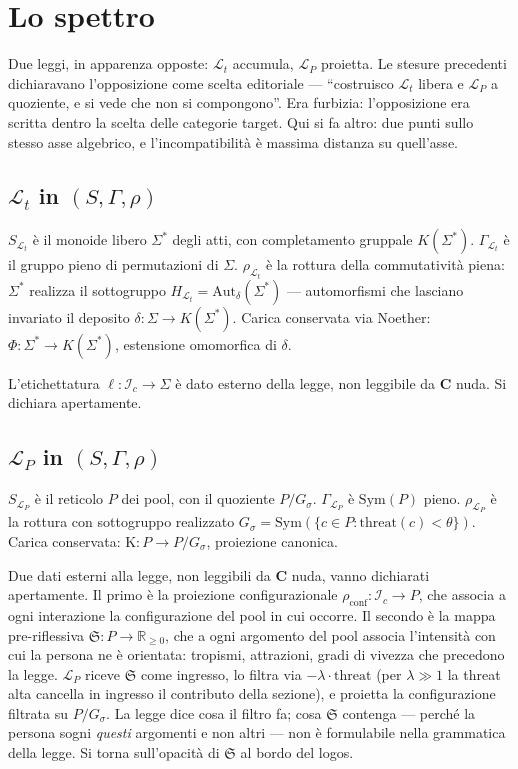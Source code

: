 \documentclass[
    oneside,                 %
    openany,                 %
    titlepage,
    11pt,
    a4paper,
    italian,
    DIV=14,                  %
    headinclude,
    footinclude=true,
    cleardoublepage=empty
]{scrbook}
\theoremstyle{ctplain}
\theoremstyle{ctdef}
\theoremstyle{ctrem}
\newcommand{\Lt}{\mathcal{L}_t}
\newcommand{\LP}{\mathcal{L}_P}
\newcommand{\Sogno}{\mathfrak{S}}
\newcommand{\Phii}{\Phi}
\newcommand{\Kappaa}{\mathrm{K}}
\newcommand{\Sym}{\mathrm{Sym}}
\newcommand{\Gs}{G_{\sigma}}
\newcommand{\KSigma}{K(\Sigma^{*})}
\begin{document}
\chapter{Lo spettro}

Due leggi, in apparenza opposte: $\Lt$ accumula, $\LP$ proietta. Le stesure precedenti dichiaravano l'opposizione come scelta editoriale --- ``costruisco $\Lt$ libera e $\LP$ a quoziente, e si vede che non si compongono''. Era furbizia: l'opposizione era scritta dentro la scelta delle categorie target. Qui si fa altro: due punti sullo stesso asse algebrico, e l'incompatibilità è massima distanza su quell'asse.

\section*{$\Lt$ in $(S, \Gamma, \rho)$}

$S_{\Lt}$ è il monoide libero $\Sigma^{*}$ degli atti, con completamento gruppale $\KSigma$. $\Gamma_{\Lt}$ è il gruppo pieno di permutazioni di $\Sigma$. $\rho_{\Lt}$ è la rottura della commutatività piena: $\Sigma^{*}$ realizza il sottogruppo $H_{\Lt} = \mathrm{Aut}_\delta(\Sigma^{*})$ --- automorfismi che lasciano invariato il deposito $\delta : \Sigma \to \KSigma$. Carica conservata via Noether: $\Phii : \Sigma^{*} \to \KSigma$, estensione omomorfica di $\delta$.

L'etichettatura $\ell : \mathcal{I}_c \to \Sigma$ è dato esterno della legge, non leggibile da $\mathbf{C}$ nuda. Si dichiara apertamente.

\section*{$\LP$ in $(S, \Gamma, \rho)$}

$S_{\LP}$ è il reticolo $P$ dei pool, con il quoziente $P/\Gs$. $\Gamma_{\LP}$ è $\Sym(P)$ pieno. $\rho_{\LP}$ è la rottura con sottogruppo realizzato $\Gs = \Sym(\{c \in P : \mathrm{threat}(c) < \theta\})$. Carica conservata: $\Kappaa : P \to P/\Gs$, proiezione canonica.

Due dati esterni alla legge, non leggibili da $\mathbf{C}$ nuda, vanno dichiarati apertamente. Il primo è la proiezione configurazionale $\rho_{\mathrm{conf}} : \mathcal{I}_c \to P$, che associa a ogni interazione la configurazione del pool in cui occorre. Il secondo è la mappa pre-riflessiva $\Sogno : P \to \mathbb{R}_{\geq 0}$, che a ogni argomento del pool associa l'intensità con cui la persona ne è orientata: tropismi, attrazioni, gradi di vivezza che precedono la legge. $\LP$ riceve $\Sogno$ come ingresso, lo filtra via $-\lambda \cdot \mathrm{threat}$ (per $\lambda \gg 1$ la threat alta cancella in ingresso il contributo della sezione), e proietta la configurazione filtrata su $P/\Gs$. La legge dice cosa il filtro fa; cosa $\Sogno$ contenga --- perché la persona sogni \emph{questi} argomenti e non altri --- non è formulabile nella grammatica della legge. Si torna sull'opacità di $\Sogno$ al bordo del logos.
\end{document}
